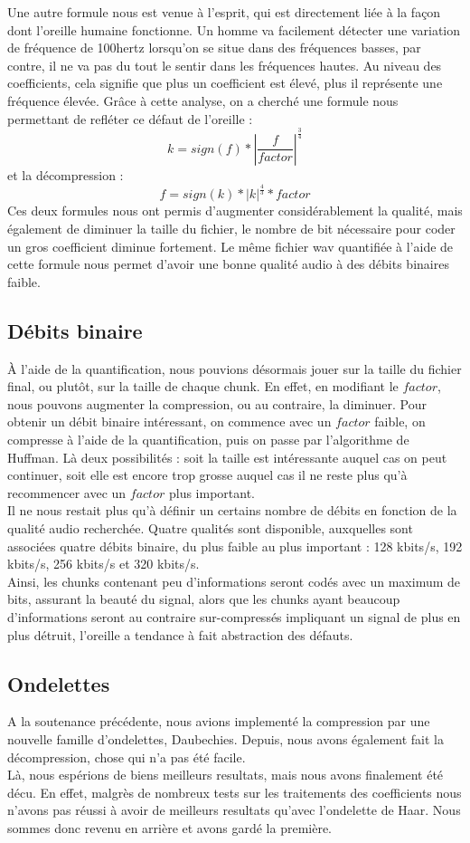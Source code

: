 \documentclass[a4paper,12pt]{report}
\begin{document}
Une autre formule nous est venue à l'esprit, qui est directement liée à la façon
dont l'oreille humaine fonctionne. Un homme va facilement détecter une variation
de fréquence de 100hertz lorsqu'on se situe dans des fréquences basses, par
contre, il ne va pas du tout le sentir dans les fréquences hautes. Au niveau des
coefficients, cela signifie que plus un coefficient est élevé, plus il
représente une fréquence élevée. Grâce à cette analyse, on a cherché une formule
nous permettant de refléter ce défaut de l'oreille :
$$ k = sign\left(f\right) * \left|\frac{f}{factor}\right|^{\frac{3}{4}}$$
et la décompression :
$$ f = sign\left(k\right) * \left|k\right|^{\frac{4}{3}} * factor$$
Ces deux formules nous ont permis d'augmenter considérablement la qualité, mais
également de diminuer la taille du fichier, le nombre de bit nécessaire pour
coder un gros coefficient diminue fortement. Le même fichier wav quantifiée à
l'aide de cette formule nous permet d'avoir une bonne qualité audio à des débits
binaires faible.
\subsection{Débits binaire}
À l'aide de la quantification, nous pouvions désormais jouer sur la taille du
fichier final, ou plutôt, sur la taille de chaque chunk. En effet, en modifiant
le $factor$, nous pouvons augmenter la compression, ou au contraire, la
diminuer. Pour obtenir un débit binaire intéressant, on commence avec un
$factor$ faible, on compresse à l'aide de la quantification, puis on passe par
l'algorithme de Huffman. Là deux possibilités : soit la taille est intéressante
auquel cas on peut continuer, soit elle est encore trop grosse auquel cas il ne
reste plus qu'à recommencer avec un $factor$ plus important.\\
Il ne nous restait plus qu'à définir un certains nombre de débits en fonction de
la qualité audio recherchée. Quatre qualités sont disponible, auxquelles sont
associées quatre débits binaire, du plus faible au plus important : 128 kbits/s,
192 kbits/s, 256 kbits/s et 320 kbits/s.\\
Ainsi, les chunks contenant peu d'informations seront codés avec un maximum de
bits, assurant la beauté du signal, alors que les chunks ayant beaucoup
d'informations seront au contraire sur-compressés impliquant un signal de plus
en plus détruit, l'oreille a tendance à fait abstraction des défauts.
\subsection{Ondelettes}
A la soutenance pr\'ec\'edente, nous avions implement\'e la compression par
une nouvelle famille d'ondelettes, Daubechies. Depuis, nous avons
\'egalement fait la d\'ecompression, chose qui n'a pas \'et\'e facile.\\
L\`a, nous esp\'erions de biens meilleurs resultats, mais nous
avons finalement \'et\'e d\'ecu. En effet, malgr\`es de nombreux tests sur les
traitements des coefficients nous n'avons pas r\'eussi \`a avoir de
meilleurs resultats qu'avec l'ondelette de Haar. Nous sommes donc
revenu en arri\`ere et avons gard\'e la premi\`ere.
\end{document}
